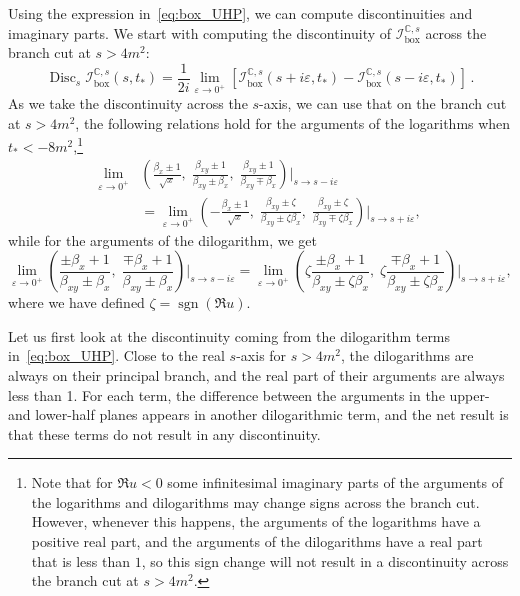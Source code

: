 \documentclass[12pt]{article}
\numberwithin{figure}{section}
\DeclareMathOperator{\sgn}{sgn}
\DeclareMathOperator{\Disc}{Disc}
\def \be {\begin{equation}}
\def \ee {\end{equation}}
\def \nn {\nonumber}
\def \C {\mathbb{C}}
\def \eps {\varepsilon}
\def \I {\mathcal{I}}
\def \boxx {\mathrm{box}}
\begin{document}
	Using the expression in~\eqref{eq:box_UHP}, we can compute discontinuities and imaginary parts. We start with computing the discontinuity of $\I_\boxx^{\C,s}$ across the branch cut at $s>4m^2$:
	\begin{equation}
	    \Disc_s \I_\boxx^{\C,s}(s,t_\ast) = \frac{1}{2 i} \lim_{\varepsilon \to 0^+} \left[ \I^{\C,s}_\boxx(s+i \varepsilon,t_\ast) - \I^{\C,s}_\boxx(s-i \varepsilon,t_\ast) \right] \,.
	\end{equation}
	As we take the discontinuity across the $s$-axis, we can use that on the branch cut at $s>4m^2$, the following relations hold for the arguments of the logarithms when $t_\ast < - 8 m^2$,\footnote{Note that for $\Re u <0$ some infinitesimal imaginary parts of the arguments of the logarithms and dilogarithms may change signs across the branch cut. However, whenever this happens, the arguments of the logarithms have a positive real part, and the arguments of the dilogarithms have a real part that is less than $1$, so this sign change will not result in a discontinuity across the branch cut at $s>4m^2$.}
	\begin{align} 
	    \lim_{\eps \to 0^+} &\left( \frac{\beta_x\pm 1}{\sqrt{x}},\;
	    \frac{\beta_{xy}\pm 1}{\beta_{xy}\pm \beta_x},\;
	    \frac{\beta_{xy}\pm 1}{\beta_{xy}\mp \beta_x}
	    \right) \bigg|_{s\to s-i \eps} \nn\\
	    & = \lim_{\eps \to 0^+} \left( -\frac{\beta_x \pm 1}{\sqrt{x}},\;
	    \frac{\beta_{xy} \pm \zeta }{\beta_{xy} \pm  \zeta \beta_x},\;
	    \frac{\beta_{xy}\pm \zeta }{\beta_{xy}\mp \zeta \beta_x}
	    \right) \bigg|_{s\to s+i \eps},
	   \label{eq:discLHPrel}
	   \end{align}
	   while for the arguments of the dilogarithm, we get
	   \be
	    \lim_{\eps \to 0^+}\left(
	    \frac{\pm \beta_x+1}{\beta_{xy}\pm \beta_x},\;
	    \frac{\mp \beta_x+1}{\beta_{xy}\pm \beta_x}
	    \right) \bigg|_{s\to s-i \eps} 
	    =
	    \lim_{\eps \to 0^+}
	    \left(
	    \zeta
	    \frac{\pm \beta_x+1}{\beta_{xy}\pm \zeta \beta_x},\;
	    \zeta
	    \frac{\mp \beta_x+1}{\beta_{xy}\pm \zeta \beta_x}
	    \right) \bigg|_{s\to s+i \eps},
	   \label{eq:discLHPrelLi}
	   \ee
	where we have defined $\zeta = \sgn(\Re u)$.
	
	Let us first look at the discontinuity coming from the dilogarithm terms in~\eqref{eq:box_UHP}. Close to the real $s$-axis for $s>4m^2$, the dilogarithms are always on their principal branch, and the real part of their arguments are always less than 1. For each term, the difference between the arguments in the upper- and lower-half planes appears in another dilogarithmic term, and the net result is that these terms do not result in any discontinuity.
	
\end{document}
